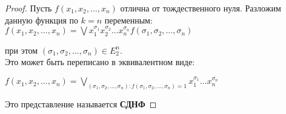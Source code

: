 \begin{proof} 
Пусть $f(x_{1}, x_{2}, \ldots, x_{n})$ отлична от тождественного нуля. Разложим данную функция по $k = n$ переменным: \\
$f(x_{1}, x_{2}, \ldots, x_{n}) = \bigvee x^{\sigma_{1}}_{1}   x^{\sigma_{2}}_{2}   \ldots   x^{\sigma_{n}}_{n} f(\sigma_{1}, \sigma_{2},\ldots,\sigma_{n})$

при этом $(\sigma_{1}, \sigma_{2},\ldots,\sigma_{n}) \in E^n_{2}$.\\

Это может быть переписано в эквивалентном виде:

$f(x_1, x_2, \dots, x_n) = \bigvee_{(\sigma_1, \sigma_2, \dots, \sigma_n): f(\sigma_1, \sigma_2, \dots, \sigma_n) = 1} x_1^{\sigma_1}  \dots  x_n^{\sigma_n}$

Это представление называется \textbf{СДНФ}
\end{proof}





